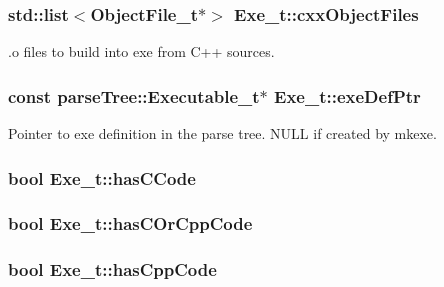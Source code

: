 \subsubsection[{\texorpdfstring{cxx\+Object\+Files}{cxxObjectFiles}}]{\setlength{\rightskip}{0pt plus 5cm}std\+::list$<${\bf Object\+File\+\_\+t}$\ast$$>$ Exe\+\_\+t\+::cxx\+Object\+Files}\hypertarget{struct_exe__t_acd90cda7b607a255bbbeacd69b26fcc5}{}\label{struct_exe__t_acd90cda7b607a255bbbeacd69b26fcc5}


.o files to build into exe from C++ sources. 

\subsubsection[{\texorpdfstring{exe\+Def\+Ptr}{exeDefPtr}}]{\setlength{\rightskip}{0pt plus 5cm}const {\bf parse\+Tree\+::\+Executable\+\_\+t}$\ast$ Exe\+\_\+t\+::exe\+Def\+Ptr}\hypertarget{struct_exe__t_a2786cb44eee3961b9dded6d769dedd6a}{}\label{struct_exe__t_a2786cb44eee3961b9dded6d769dedd6a}
Pointer to exe definition in the parse tree. N\+U\+LL if created by mkexe. 
\subsubsection[{\texorpdfstring{has\+C\+Code}{hasCCode}}]{\setlength{\rightskip}{0pt plus 5cm}bool Exe\+\_\+t\+::has\+C\+Code}\hypertarget{struct_exe__t_aeba6ebbf369e06e136998103270150f4}{}\label{struct_exe__t_aeba6ebbf369e06e136998103270150f4}
\subsubsection[{\texorpdfstring{has\+C\+Or\+Cpp\+Code}{hasCOrCppCode}}]{\setlength{\rightskip}{0pt plus 5cm}bool Exe\+\_\+t\+::has\+C\+Or\+Cpp\+Code}\hypertarget{struct_exe__t_a7788fd790cbc3dd823bd6b523c8d9670}{}\label{struct_exe__t_a7788fd790cbc3dd823bd6b523c8d9670}
\subsubsection[{\texorpdfstring{has\+Cpp\+Code}{hasCppCode}}]{\setlength{\rightskip}{0pt plus 5cm}bool Exe\+\_\+t\+::has\+Cpp\+Code}\hypertarget{struct_exe__t_a72cc638b25b30e0d5b33e0d604a37b0e}{}\label{struct_exe__t_a72cc638b25b30e0d5b33e0d604a37b0e}
